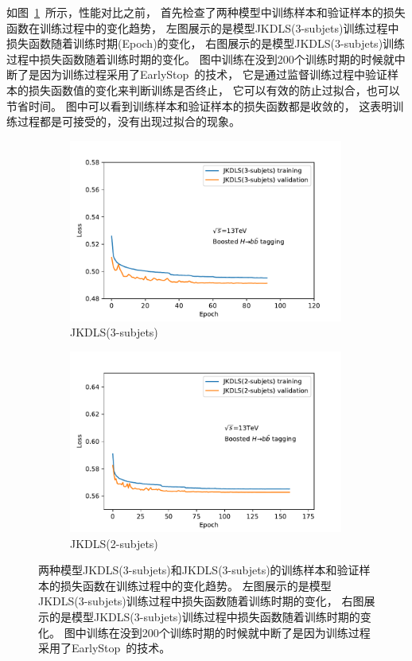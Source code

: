 如图~\ref{fig:SUBLOSS}~所示，性能对比之前，
首先检查了两种模型中训练样本和验证样本的损失函数在训练过程中的变化趋势，
左图展示的是模型JKDLS(3-subjets)训练过程中损失函数随着训练时期(Epoch)的变化，
右图展示的是模型JKDLS(3-subjets)训练过程中损失函数随着训练时期的变化。
图中训练在没到200个训练时期的时候就中断了是因为训练过程采用了EarlyStop~\cite{EarlyStop}的技术，
它是通过监督训练过程中验证样本的损失函数值的变化来判断训练是否终止，
它可以有效的防止过拟合，也可以节省时间。
图中可以看到训练样本和验证样本的损失函数都是收敛的，
这表明训练过程都是可接受的，没有出现过拟合的现象。

\begin{figure}[htbp]
  \begin{subfigure}{.5\textwidth}
  \centering
   \includegraphics[width=0.99\textwidth]{figuresXbb/Subjet/SUB3Loss.pdf}
   \caption{JKDLS(3-subjets)}
  \end{subfigure}
  \begin{subfigure}{.5\textwidth}
  \centering
   \includegraphics[width=0.99\textwidth]{figuresXbb/Subjet/SUB2Loss.pdf}
   \caption{JKDLS(2-subjets)}
  \end{subfigure}
  \caption{ 
 两种模型JKDLS(3-subjets)和JKDLS(3-subjets)的训练样本和验证样本的损失函数在训练过程中的变化趋势。
左图展示的是模型JKDLS(3-subjets)训练过程中损失函数随着训练时期的变化，
右图展示的是模型JKDLS(3-subjets)训练过程中损失函数随着训练时期的变化。
图中训练在没到200个训练时期的时候就中断了是因为训练过程采用了EarlyStop~\cite{EarlyStop}的技术。
   }
  \label{fig:SUBLOSS}
\end{figure} 

